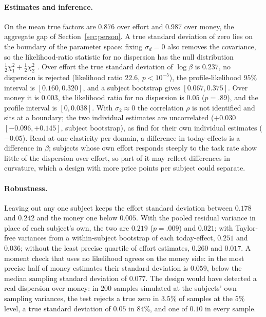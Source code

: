 \documentclass[11pt,a4paper]{article}
\theoremstyle{plain}
\theoremstyle{definition}
\begin{document}
\paragraph{Estimates and inference.} On \citet{ans2015} the mean true factors are $0.876$ over effort and $0.987$
over money, the aggregate gap of Section~\ref{sec:person}. A true standard deviation of zero lies on the boundary of
the parameter space: fixing $\sigma_d=0$ also removes the covariance, so the likelihood-ratio statistic for no
dispersion has the null distribution $\tfrac12\chi^2_1+\tfrac12\chi^2_2$ \citep{stramlee1994}. Over effort the true
standard deviation of $\log\beta$ is $0.237$, no dispersion is rejected (likelihood ratio $22.6$, $p<10^{-5}$), the
profile-likelihood $95\%$ interval is $[0.160,0.320]$, and a subject bootstrap gives $[0.067,0.375]$. Over money it
is $0.003$, the likelihood ratio for no dispersion is $0.05$ ($p=.89$), and the profile interval is $[0,0.038]$. With
$\sigma_2\approx0$ the correlation $\rho$ is not identified and sits at a boundary; the two individual estimates are
uncorrelated ($+0.030$ $[-0.096,+0.145]$, subject bootstrap), as \citeauthor{ans2015} find for their own individual
estimates ($-0.05$). Read at one elasticity per domain, a difference in today-effects is a difference in $\beta$;
subjects whose own effort responds steeply to the task rate show little of the dispersion over effort, so part of it
may reflect differences in curvature, which a design with more price points per subject could separate.

\paragraph{Robustness.} Leaving out any one subject keeps the effort standard deviation between $0.178$ and $0.242$
and the money one below $0.005$. With the pooled residual variance in place of each subject's own, the two are
$0.219$ ($p=.009$) and $0.021$; with Taylor-free variances from a within-subject bootstrap of each today-effect,
$0.251$ and $0.036$; without the least precise quartile of effort estimates, $0.260$ and $0.017$. A moment check that
uses no likelihood agrees on the money side: in the most precise half of money estimates their standard deviation is
$0.059$, below the median sampling standard deviation of $0.077$. The design would have detected a real dispersion
over money: in $200$ samples simulated at the subjects' own sampling variances, the test rejects a true zero in $3.5\%$
of samples at the $5\%$ level, a true standard deviation of $0.05$ in $84\%$, and one of $0.10$ in every sample.
\end{document}
